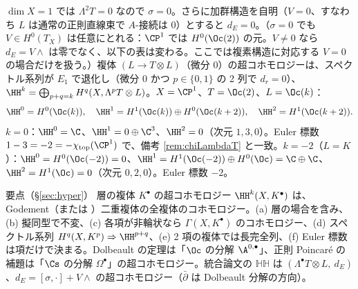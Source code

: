 \begin{ex}[$\CP^1$：$\sigma=0$、自明な加群構造の場合]\label{ex:HHP1}\tP
$\dim X=1$ では $\Lambda^2T=0$ なので $\sigma=0$。さらに加群構造を自明（$V=0$、すなわち $L$ は通常の正則直線束で $A$-接続は $0$）とすると $d_E=0$。（$\sigma=0$ でも $V\in H^0(T_X)$ は任意にとれる：$\CP^1$ では $H^0(\Oc(2))$ の元。$V\ne0$ なら $d_E=V\wedge$ は零でなく、以下の表は変わる。ここでは複素構造に対応する $V=0$ の場合だけを扱う。）複体 $(L\to T\otimes L)$（微分 $0$）の超コホモロジーは、スペクトル系列が $E_1$ で退化し（微分 $0$ かつ $p\in\{0,1\}$ の 2 列で $d_r=0$）、$\HH^k=\bigoplus_{p+q=k}H^q(X,\Lambda^pT\otimes L)$。$X=\CP^1$、$T=\Oc(2)$、$L=\Oc(k)$：
\[
\HH^0=H^0(\Oc(k)),\quad\HH^1=H^1(\Oc(k))\oplus H^0(\Oc(k+2)),\quad\HH^2=H^1(\Oc(k+2)).
\]
$k=0$：$\HH^0=\C$、$\HH^1=0\oplus\C^3$、$\HH^2=0$（次元 $1,3,0$）。Euler 標数 $1-3=-2=-\chi_{\mathrm{top}}(\CP^1)$ で、備考 \ref{rem:chiLambdaT} と一致。$k=-2$（$L=K$）：$\HH^0=H^0(\Oc(-2))=0$、$\HH^1=H^1(\Oc(-2))\oplus H^0(\Oc)=\C\oplus\C$、$\HH^2=H^1(\Oc)=0$（次元 $0,2,0$）。Euler 標数 $-2$。
\end{ex}

\begin{keybox}{要点（§\ref{sec:hyper}）}
層の複体 $K^\bullet$ の超コホモロジー $\HH^k(X,K^\bullet)$ は、Godement（または \Cech{}）二重複体の全複体のコホモロジー。(a) 層の場合を含み、(b) 擬同型で不変、(c) 各項が非輪状なら $\Gamma(X,K^\bullet)$ のコホモロジー、(d) スペクトル系列 $H^q(X,K^p)\Rightarrow\HH^{p+q}$、(e) 2 項の複体では長完全列、(f) Euler 標数は項だけで決まる。Dolbeault の定理は「$\Oc$ の分解 $\A^{0,\bullet}$」、正則 Poincar\'e の補題は「$\Cs$ の分解 $\Omega^\bullet$」の超コホモロジー。統合論文の $\mathbb{HH}$ は $(\Lambda^\bullet T\otimes L,\ d_E)$、$d_E=[\sigma,\cdot]+V\wedge$ の超コホモロジー（$\bar\partial$ は Dolbeault 分解の方向）。
\end{keybox}

